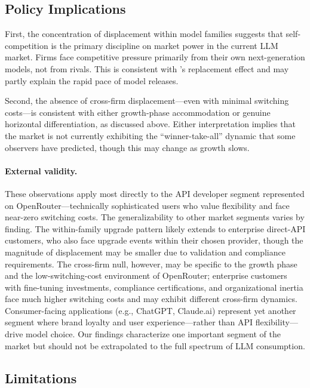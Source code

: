\documentclass[11pt, a4paper]{article}
\begin{document}
\subsection{Policy Implications}

First, the concentration of displacement within model families suggests that self-competition is the primary discipline on market power in the current LLM market. Firms face competitive pressure primarily from their own next-generation models, not from rivals. This is consistent with \citet{arrow1962economic}'s replacement effect and may partly explain the rapid pace of model releases.

Second, the absence of cross-firm displacement---even with minimal switching costs---is consistent with either growth-phase accommodation or genuine horizontal differentiation, as discussed above. Either interpretation implies that the market is not currently exhibiting the ``winner-take-all'' dynamic that some observers have predicted, though this may change as growth slows.

\paragraph{External validity.} These observations apply most directly to the API developer segment represented on OpenRouter---technically sophisticated users who value flexibility and face near-zero switching costs. The generalizability to other market segments varies by finding. The within-family upgrade pattern likely extends to enterprise direct-API customers, who also face upgrade events within their chosen provider, though the magnitude of displacement may be smaller due to validation and compliance requirements. The cross-firm null, however, may be specific to the growth phase and the low-switching-cost environment of OpenRouter; enterprise customers with fine-tuning investments, compliance certifications, and organizational inertia face much higher switching costs and may exhibit different cross-firm dynamics. Consumer-facing applications (e.g., ChatGPT, Claude.ai) represent yet another segment where brand loyalty and user experience---rather than API flexibility---drive model choice. Our findings characterize one important segment of the market but should not be extrapolated to the full spectrum of LLM consumption.

\subsection{Limitations}
\end{document}
